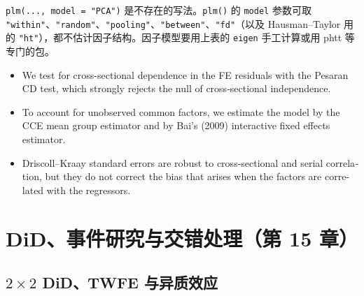 \begin{note}
\texttt{plm(..., model = "PCA")} 是不存在的写法。\texttt{plm()} 的 \texttt{model} 参数可取 \texttt{"within"}、\texttt{"random"}、\texttt{"pooling"}、\texttt{"between"}、\texttt{"fd"}（以及 Hausman–Taylor 用的 \texttt{"ht"}），都不估计因子结构。因子模型要用上表的 \texttt{eigen} 手工计算或用 phtt 等专门的包。
\end{note}

\begin{english}
\begin{itemize}
  \item We test for cross-sectional dependence in the FE residuals with the Pesaran CD test, which strongly rejects the null of cross-sectional independence.
  \item To account for unobserved common factors, we estimate the model by the CCE mean group estimator and by Bai's (2009) interactive fixed effects estimator.
  \item Driscoll--Kraay standard errors are robust to cross-sectional and serial correlation, but they do not correct the bias that arises when the factors are correlated with the regressors.
\end{itemize}
\end{english}

\section{DiD、事件研究与交错处理（第 15 章）}\label{sec:UappB-did}

\subsection{\texorpdfstring{$2\times 2$}{2x2} DiD、TWFE 与异质效应}

